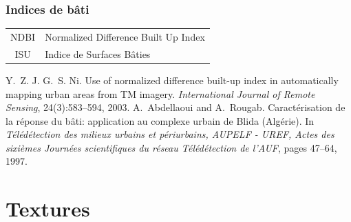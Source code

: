 \documentclass[compress,handout]{beamer}
\begin{document}
\begin{frame}
\frametitle{Indices de bâti}
\footnotesize \centering
\begin{tabular}{|c|l|}
\hline
NDBI &  Normalized Difference Built Up Index \cite{Zha2003-NDBI} \\
ISU &  Indice de Surfaces Bâties \cite{Abdellaoui1997-ISU} \\
\hline
\end{tabular}
\begin{thebibliography}{noidea}
\tiny
{}
Y.~Z. J. G.~S. Ni.
 Use of normalized difference built-up index in automatically mapping
  urban areas from {TM} imagery.
 {\em International Journal of Remote Sensing}, 24(3):583--594,
        2003.
A.~Abdellaoui and A.~Rougab.
 Caract\'erisation de la réponse du b\^ati: application au complexe
  urbain de {B}lida ({A}lg\'erie).
 In {\em T\'el\'ed\'etection des milieux urbains et p\'eriurbains,
  AUPELF - UREF, Actes des sixi\`emes Journ\'ees scientifiques du r\'eseau
  T\'el\'ed\'etection de l'AUF}, pages 47--64, 1997.
\end{thebibliography}
\end{frame}


\section{Textures}
\end{document}
